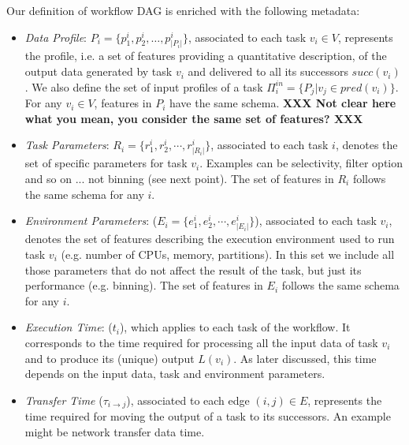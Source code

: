 \documentclass[a4paper, 10pt, conference]{ieeeconf}      %
\begin{document}
Our definition of workflow DAG is enriched with the following metadata:
\begin{itemize}
    
    \item \textit{Data Profile}:  $P_{i} = \{p^{i}_1, p^{i}_2, \ldots,p^{i}_{|P_{i}|}\}$, associated to each task $v_i\in V$, represents the profile, i.e. a set of features providing a quantitative description, of the output data generated by task $v_i$ and delivered to all its successors $succ(v_i)$. We also define the set of input profiles  of a task $\Pi_i^{in} = \{ P_{j} | v_j \in pred(v_i)\}$. For any $v_i \in V$, features in $P_{i}$ have the same schema. \textbf{XXX Not clear here what you mean, you consider the same set of features? XXX}
    
    \item \textit{Task Parameters}: $R_{i} = \{r^i_1, r^i_2, \cdots, r^i_{|R_{i}|} \} $, associated to each task $i$, denotes the set of specific parameters for task $v_i$. Examples can be selectivity, filter option and so on ... not binning (see next point). The set of features in $R_i$ follows the same schema for any $i$.
    \item  \textit{Environment Parameters}: ($E_{i} = \{e^i_1, e^i_2, \cdots, e^i_{|E_{i}|} \} $), associated to each task $v_i$, denotes the set of features describing the execution environment used to run task  $v_i$ (e.g. number of CPUs, memory, partitions). In this set we include all those parameters that do not affect the result of the task, but just its performance (e.g. binning). The set of features in $E_i$ follows the same schema for any $i$.
    \item \textit{Execution Time}: ($t_i$), which applies to each task of the workflow. It corresponds to the time required for processing all the input data of task $v_i$  and to produce its (unique) output $L(v_i)$. As later discussed, this time depends on the input data, task and environment parameters. 
    \item \textit{Transfer Time} ($\tau_{i\rightarrow j}$), associated to each edge $(i,j)\in E$, represents the time required for moving the output of a task to its successors. An example might be network transfer  data time.
\end{itemize}
\end{document}
